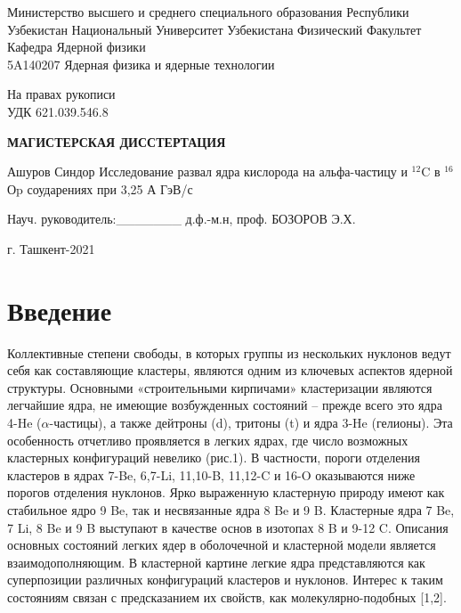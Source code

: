 \documentclass[fontsize=14pt]{scrarticle}
\begin{document}
	\begin{titlepage}
		\begin{center}
		\large	Министерство высшего и среднего специального образования Республики Узбекистан 
Национальный  Университет Узбекистана  
Физический Факультет Кафедра Ядерной физики\\
 5A140207 Ядерная физика и ядерные технологии
			\vspace{0.25cm}
			
			
			\begin{flushright}
			\small{На правах рукописи}\\
           \small{ УДК 621.039.546.8}
			\end{flushright}
			\vfill
			
			\large \textbf{МАГИСТЕРСКАЯ ДИССТЕРТАЦИЯ }
			
			Ашуров Синдор
			\vfill
			{\large Исследование развал ядра кислорода на альфа-частицу и $^{12}$C в $^{16}$Оp соударениях при 3,25 А ГэВ/с\\
			}
			\bigskip
		\end{center}

         
         \vfill
         
         \begin{flushleft}

Науч. руководитель:\_\_\_\_\_\_\_ д.ф.-м.н, проф. БОЗОРОВ Э.Х.
         \end{flushleft}
		\vfill
		
		\vfill
		\begin{center}
			г. Ташкент-2021
		\end{center}
	\end{titlepage}
	\newpage
	\makenomenclature 
	\renewcommand{\nomname}{Перечень условных обозначений}
    \newcommand*{\nom}[2]{#1\nomenclature{#1}{#2}}
	\printnomenclature[5em]
	\newpage
	\renewcommand{\contentsname}{Содержание}
	\tableofcontents
	\newpage
	
\section*{Введение}
	Коллективные степени свободы, в которых группы из нескольких нуклонов ведут себя как составляющие кластеры, являются одним из ключевых аспектов ядерной структуры. Основными «строительными кирпичами» кластеризации являются легчайшие ядра, не имеющие возбужденных состояний – прежде всего это ядра 4-He ($\alpha$-частицы), а также дейтроны (d), тритоны (t) и ядра 3-He (гелионы). Эта особенность отчетливо проявляется в легких ядрах, где число возможных кластерных конфигураций невелико (рис.1). В частности, пороги отделения кластеров в ядрах 7-Be, 6,7-Li, 11,10-B, 11,12-C и 16-O оказываются ниже порогов отделения нуклонов. Ярко выраженную кластерную природу имеют как стабильное ядро 9 Be, так и несвязанные ядра 8 Be и 9 B. Кластерные ядра 7 Be, 7 Li, 8 Be и 9 B выступают в качестве основ в изотопах 8 B и 9-12 C. Описания основных состояний легких ядер в оболочечной и кластерной модели является взаимодополняющим. В кластерной картине легкие ядра представляются как суперпозиции различных конфигураций кластеров и нуклонов. Интерес к таким состояниям связан с предсказанием их свойств, как молекулярно-подобных [1,2].
	
\end{document}
